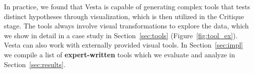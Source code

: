 \documentclass{article}
\newcommand\gd[1]{\todo[color=red!40]{{\bf Greg}: #1}}
\newcommand\jl[1]{\todo[color=blue!40]{{\bf Jessy}: #1}}
\newcommand{\method}{{\sc Vesta}}
\begin{document}
In practice, we found that \method{} is capable of generating complex tools that tests distinct hypotheses through visualization, which is then utilized in the Critique stage. The tools always involve visual transformations to explore the data, which we show in detail in a case study in Section~\ref{sec:tools} (Figure~\ref{fig:tool_ex}).
\method{} can also work with externally provided visual tools. In Section~\ref{sec:impl} we compile a list of \textbf{expert-written} tools which we evaluate and analyze in Section~\ref{sec:results}.


\end{document}
